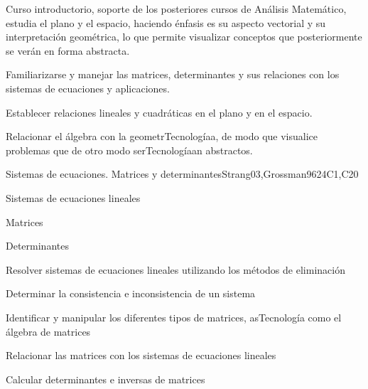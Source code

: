 \begin{syllabus}


\begin{justification}
Curso introductorio, soporte de los posteriores cursos de Análisis Matemático, 
estudia el plano y el espacio, haciendo énfasis es su aspecto vectorial y su interpretación geométrica, 
lo que permite visualizar conceptos que posteriormente se verán en forma abstracta.
\end{justification}

\begin{goals}
\item Familiarizarse y manejar las matrices, determinantes y sus relaciones con los sistemas de ecuaciones y aplicaciones.
\item Establecer relaciones lineales y cuadráticas en el plano y en el espacio.
\item Relacionar el álgebra con la geometrTecnologíaa, de modo que visualice problemas que de otro modo serTecnologíaan abstractos.
\end{goals}

\begin{outcomes} 
    \item {}  
    \item {}
\end{outcomes}

\begin{competences}  
    \item {}
    \item {}
\end{competences}

\begin{unit}{}{Sistemas de ecuaciones. Matrices y determinantes}{Strang03,Grossman96}{24}{C1,C20}
   \begin{topics}
      \item Sistemas de ecuaciones lineales
      \item Matrices
      \item Determinantes
      \end{topics}

   \begin{learningoutcomes}
      \item Resolver sistemas de ecuaciones lineales utilizando los métodos de eliminación
      \item Determinar la consistencia e inconsistencia de un sistema
      \item Identificar y manipular los diferentes tipos de matrices, asTecnología como el álgebra de matrices
      \item Relacionar las matrices con los sistemas de ecuaciones lineales
      \item Calcular determinantes e inversas de matrices
   \end{learningoutcomes}
\end{unit}


\end{syllabus}
